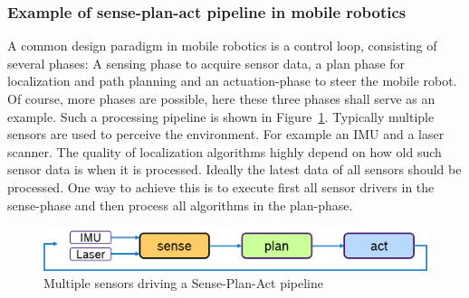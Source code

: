 \subsubsection{Example of sense-plan-act pipeline in mobile robotics}
A common design paradigm in mobile robotics is a control loop, consisting of several phases: A sensing phase to acquire sensor data, a plan phase for localization and path planning and an actuation-phase to steer the mobile robot. Of course, more phases are possible, here these three phases shall serve as an example. Such a processing pipeline is shown in Figure~\ref{f:sensePlanActScheme}. Typically multiple sensors are used to perceive the environment. For example an IMU and a laser scanner. The quality of localization algorithms highly depend on how old such sensor data is when it is processed. Ideally the latest data of all sensors should be processed. One way to achieve this is to execute first all sensor drivers in the sense-phase and then process all algorithms in the plan-phase.
\begin{figure}[htbp!]
    \centering
    \includegraphics[width=0.75\linewidth]{Img/sensePlanActScheme.png}
    \caption{Multiple sensors driving a Sense-Plan-Act pipeline}\label{f:sensePlanActScheme}
    \vspace{-0.1in}
\end{figure}

